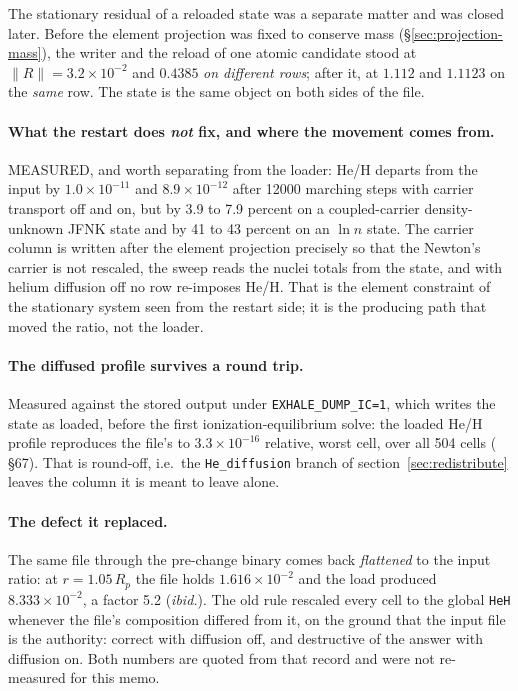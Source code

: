 \documentclass[english,a4paper]{my_memo}
\begin{document}
The stationary residual of a reloaded state was a separate matter and was
closed later. Before the element projection was fixed to conserve mass
(\S\ref{sec:projection-mass}), the writer and the reload of one atomic
candidate stood at $\|R\| = 3.2\times10^{-2}$ and $0.4385$ \emph{on
different rows}; after it, at $1.112$ and $1.1123$ on the \emph{same} row.
The state is the same object on both sides of the file.

\paragraph{What the restart does \emph{not} fix, and where the movement
comes from.} MEASURED, and worth separating from the loader: He/H departs
from the input by $1.0\times10^{-11}$ and $8.9\times10^{-12}$ after 12000
marching steps with carrier transport off and on, but by 3.9 to 7.9 percent
on a coupled-carrier density-unknown JFNK state and by 41 to 43 percent on
an $\ln n$ state. The carrier column is written after the element projection
precisely so that the Newton's carrier is not rescaled, the sweep reads the
nuclei totals from the state, and with helium diffusion off no row re-imposes
He/H. That is the element constraint of the stationary system seen from the
restart side; it is the producing path that moved the ratio, not the loader.

\paragraph{The diffused profile survives a round trip.} Measured against the
stored  output under \verb|EXHALE_DUMP_IC=1|,
which writes the state as loaded, before the first ionization-equilibrium
solve: the loaded He/H profile reproduces the file's to
$3.3\times10^{-16}$ relative, worst cell, over all 504 cells
( \S67). That is round-off, i.e.\ the
\verb|He_diffusion| branch of section~\ref{sec:redistribute} leaves the
column it is meant to leave alone.

\paragraph{The defect it replaced.} The same file through the pre-change
binary comes back \emph{flattened} to the input ratio: at $r = 1.05\,R_p$
the file holds $1.616\times10^{-2}$ and the load produced
$8.333\times10^{-2}$, a factor 5.2 (\emph{ibid.}). The old rule rescaled
every cell to the global \verb|HeH| whenever the file's composition differed
from it, on the ground that the input file is the authority: correct with
diffusion off, and destructive of the answer with diffusion on. Both
numbers are quoted from that record and were not re-measured for this memo.
\end{document}
